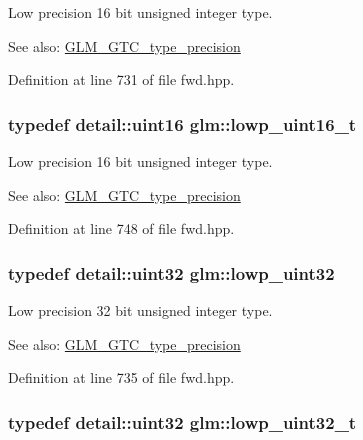 Low precision 16 bit unsigned integer type. \begin{Desc}
\item[See also:]\hyperlink{group__gtc__type__precision}{GLM\_\-GTC\_\-type\_\-precision} \end{Desc}


Definition at line 731 of file fwd.hpp.\hypertarget{group__gtc__type__precision_g9a71176a4e5bc61951f9e9197d9c80e1}{
\subsubsection[lowp\_\-uint16\_\-t]{\setlength{\rightskip}{0pt plus 5cm}typedef detail::uint16 {\bf glm::lowp\_\-uint16\_\-t}}}
\label{group__gtc__type__precision_g9a71176a4e5bc61951f9e9197d9c80e1}


Low precision 16 bit unsigned integer type. \begin{Desc}
\item[See also:]\hyperlink{group__gtc__type__precision}{GLM\_\-GTC\_\-type\_\-precision} \end{Desc}


Definition at line 748 of file fwd.hpp.\hypertarget{group__gtc__type__precision_gf11e85af414720b4cd12bd57b3a81e68}{
\subsubsection[lowp\_\-uint32]{\setlength{\rightskip}{0pt plus 5cm}typedef detail::uint32 {\bf glm::lowp\_\-uint32}}}
\label{group__gtc__type__precision_gf11e85af414720b4cd12bd57b3a81e68}


Low precision 32 bit unsigned integer type. \begin{Desc}
\item[See also:]\hyperlink{group__gtc__type__precision}{GLM\_\-GTC\_\-type\_\-precision} \end{Desc}


Definition at line 735 of file fwd.hpp.\hypertarget{group__gtc__type__precision_g9f8cb602a358e1f48bda2682cf051f0c}{
\subsubsection[lowp\_\-uint32\_\-t]{\setlength{\rightskip}{0pt plus 5cm}typedef detail::uint32 {\bf glm::lowp\_\-uint32\_\-t}}}
\label{group__gtc__type__precision_g9f8cb602a358e1f48bda2682cf051f0c}



